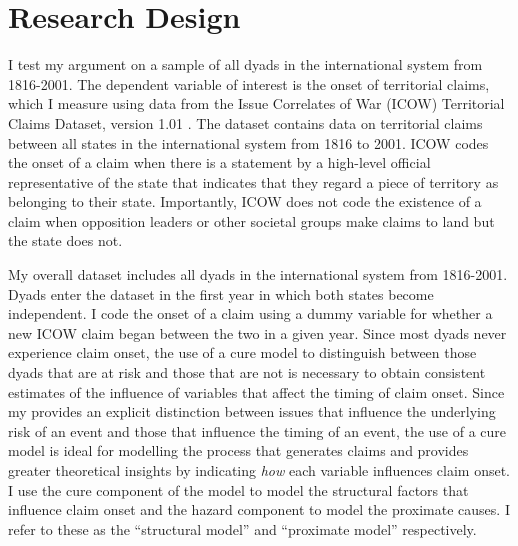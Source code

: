 \section{Research Design}


I test my argument on a sample of all dyads in the international system from 1816-2001. The dependent variable of interest is the onset of territorial claims, which I measure using data from the Issue Correlates of War (ICOW) Territorial Claims Dataset, version 1.01 \citep{frederick2017}. The dataset contains data on territorial claims between all states in the international system from 1816 to 2001. ICOW codes the onset of a claim when there is a statement by a high-level official representative of the state that indicates that they regard a piece of territory as belonging to their state. Importantly, ICOW does not code the existence of a claim when opposition leaders or other societal groups make claims to land but the state does not. 

My overall dataset includes all dyads in the international system from 1816-2001. Dyads enter the dataset in the first year in which both states become independent. I code the onset of a claim using a dummy variable for whether a new ICOW claim began between the two in a given year. Since most dyads never experience claim onset, the use of a cure model to distinguish between those dyads that are at risk and those that are not is necessary to obtain consistent estimates of the influence of variables that affect the timing of claim onset. Since my provides an explicit distinction between issues that influence the underlying risk of an event and those that influence the timing of an event, the use of a cure model is ideal for modelling the process that generates claims and provides greater theoretical insights by indicating \textit{how} each variable influences claim onset. I use the cure component of the model to model the structural factors that influence claim onset and the hazard component to model the proximate causes. I refer to these as the “structural model” and “proximate model” respectively. 




